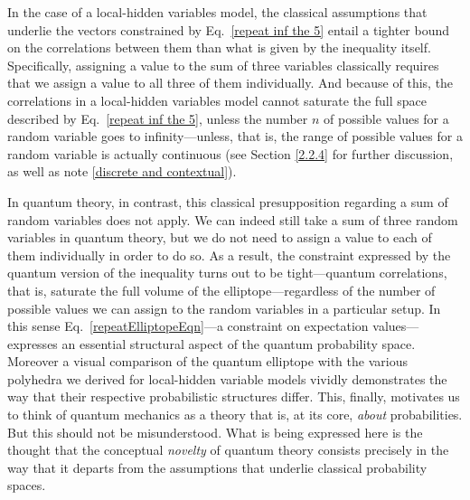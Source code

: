 In the case of a local-hidden variables model, the classical assumptions that underlie the vectors constrained by Eq.\ \eqref{repeat inf the 5} entail a tighter bound on the correlations between them than what is given by the inequality itself. Specifically, assigning a value to the sum of three variables classically requires that we assign a value to all three of them individually. And because of this, the correlations in a local-hidden variables model cannot saturate the full space described by Eq.\ \eqref{repeat inf the 5}, unless the number $n$ of possible values for a random variable goes to infinity---unless, that is, the range of possible values for a random variable is actually continuous (see Section \ref{2.2.4} for further discussion, as well as note \ref{discrete and contextual}).

In quantum theory, in contrast, this classical presupposition regarding a sum of random variables does not apply. We can indeed still take a sum of three random variables in quantum theory, but we do not need to assign a value to each of them individually in order to do so. As a result, the constraint expressed by the quantum version of the inequality turns out to be tight---quantum correlations, that is, saturate the full volume of the elliptope---regardless of the number of possible values we can assign to the random variables in a particular setup. In this sense Eq.\ \eqref{repeatElliptopeEqn}---a constraint on expectation values---expresses an essential structural aspect of the quantum probability space. Moreover a visual comparison of the quantum elliptope with the various polyhedra we derived for local-hidden variable models vividly demonstrates the way that their respective probabilistic structures differ. This, finally, motivates us to think of quantum mechanics as a theory that is, at its core, \emph{about} probabilities. But this should not be misunderstood. What is being expressed here is the thought that the conceptual \emph{novelty} of quantum theory consists precisely in the way that it departs from the assumptions that underlie classical probability spaces.

